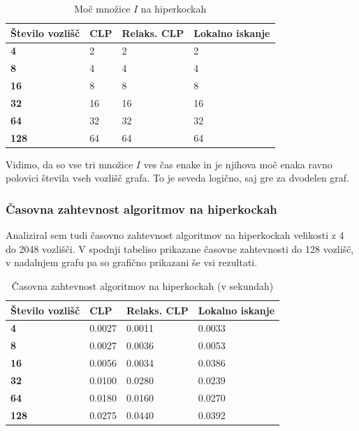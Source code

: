 \documentclass[a4paper, 12 pt]{article}
\theoremstyle{definition}
\theoremstyle{plain}
\theoremstyle{remark}
\begin{document}
\begin{table}[H]
\centering
\begin{tabular}{|p{3cm}||p{1cm}|p{2.7cm}|p{3.2cm}|}
\hline
\textbf{Število vozlišč}  & \textbf{CLP} & \textbf{Relaks. CLP} & \textbf{Lokalno iskanje} \\ \hline
\textbf{4}     & 2 &2  &2  \\ \hline
\textbf{8}    & 4 & 4 &4  \\ \hline
\textbf{16}   & 8 & 8  &8  \\ \hline
\textbf{32}  & 16 &16  &16  \\ \hline
\textbf{64}   & 32 & 32 &  32 \\ \hline
\textbf{128} & 64 & 64 & 64  \\ \hline
\end{tabular}
\caption{Moč množice $I$ na hiperkockah}
\label{fig:hipekocka I} 
\end{table}
Vidimo, da so vse tri množice $I$ ves čas enake in je njihova moč enaka ravno polovici števila vseh vozlišč grafa. To je seveda logično, saj gre za dvodelen graf. 

\subsubsection{Časovna zahtevnost algoritmov na hiperkockah}
Analiziral sem tudi časovno zahtevnost algoritmov na hiperkockah velikosti z 4 do 2048 vozlišči.
V spodnji tabeliso prikazane časovne zahtevnosti do 128 vozlišč, v nadalnjem grafu pa so grafično prikazani še vsi rezultati.

\begin{table}[H]
\centering
\begin{tabular}{|p{3cm}||p{2.8cm}|p{2.8cm}|p{3.2cm}|}
\hline
\textbf{Število vozlišč}  & \textbf{CLP} & \textbf{Relaks. CLP} & \textbf{Lokalno iskanje} \\ \hline
\textbf{4}&	0.0027&	0.0011	&0.0033\\ \hline
\textbf{8}&	0.0027	&0.0036	&0.0053\\ \hline
\textbf{16}&0.0056	&0.0034	&0.0386\\ \hline
\textbf{32}&0.0100&	0.0280	&0.0239\\ \hline
\textbf{64}&0.0180	&0.0160	&0.0270\\ \hline
\textbf{128}&0.0275	&0.0440	&0.0392\\ \hline
\end{tabular}
\caption{Časovna zahtevnost algoritmov na hiperkockah (v sekundah)}
\label{fig:hipekocka I} 
\end{table}
\end{document}
